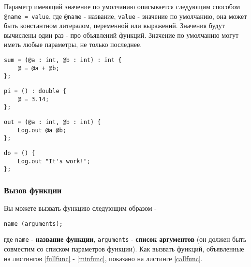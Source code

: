 Параметр имеющий значение по умолчанию описывается следующим способом \texttt{@name = value}, где \texttt{@name} - название, \texttt{value} - значение по умолчанию, она может быть константном литералом, переменной или выражений. Значения будут вычислены один раз - про объявлений функций. Значение по умолчанию могут иметь любые параметры, не только последнее.

\begin{sourcecode}
\label{fullfunc}
\begin{verbatim}
sum = (@a : int, @b : int) : int {
	@ = @a + @b;
};
\end{verbatim}
\end{sourcecode}

\begin{sourcecode}
\label{noargsfunc}
\begin{verbatim}
pi = () : double {
	@ = 3.14;
};
\end{verbatim}
\end{sourcecode}

\begin{sourcecode}
\label{notypefunc}
\begin{verbatim}
out = (@a : int, @b : int) {
	Log.out @a @b;
};
\end{verbatim}
\end{sourcecode}

\begin{sourcecode}
\label{minfunc}
\begin{verbatim}
do = () {
	Log.out "It's work!";
};
\end{verbatim}
\end{sourcecode}

\subsubsection{Вызов функции}

Вы можете вызвать функцию следующим образом -
\begin{verbatim}
name (arguments);
\end{verbatim}
где \texttt{name} - {\bf название функции}, \texttt{arguments} - {\bf список аргументов} (он должен быть совместим со списком параметров функции). Как вызвать функций, объявленные на листингов \ref{fullfunc} - \ref{minfunc}, показано на листинге \ref{callfunc}. 

